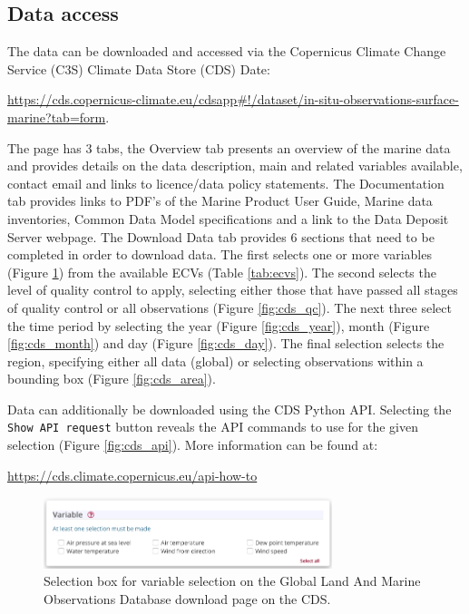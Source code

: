 \subsection{Data access}
The data can be downloaded and accessed via the Copernicus Climate Change Service (C3S) Climate Data Store (CDS) Date:
\begin{center}
\sloppy\url{https://cds.copernicus-climate.eu/cdsapp\#!/dataset/in-situ-observations-surface-marine?tab=form}.
 \end{center}
The page has 3 tabs, the Overview tab presents an overview of the marine data and provides details on the data description, main and related variables available, contact email and links to licence/data policy statements. 
The Documentation tab provides links to PDF’s of the Marine Product User Guide, Marine data inventories, Common Data Model specifications and a link to the Data Deposit Server webpage. The Download Data tab provides 6 sections that need to be completed in order to download data. The first selects one or more variables (Figure \ref{fig:cds_variable}) from the available ECVs (Table \ref{tab:ecvs}). The second selects the level of quality control to apply, selecting either those that have passed all stages of quality control or all observations (Figure \ref{fig:cds_qc}). The next three select the time period  by selecting the year (Figure \ref{fig:cds_year}), month (Figure \ref{fig:cds_month}) and day (Figure \ref{fig:cds_day}). The final selection selects the region, specifying either all data (global) or selecting observations within a bounding box (Figure \ref{fig:cds_area}).

Data can additionally be downloaded using the CDS Python API. Selecting the \texttt{Show API request} button reveals the API commands to use for the given selection (Figure \ref{fig:cds_api}). More information can be found at:
\begin{center}
\url{https://cds.climate.copernicus.eu/api-how-to}
\end{center}

\begin{figure}
\centering
\includegraphics[width=0.75\textwidth]{resources/cds_variable_select.png}
\caption{Selection box for variable selection on the Global Land And Marine Observations Database download page on the CDS.}
\label{fig:cds_variable}
\end{figure}


